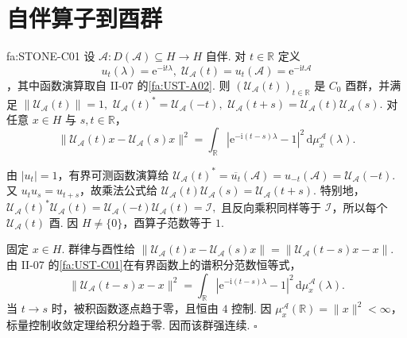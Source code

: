 \section{自伴算子到酉群}\label{sec:ii10-selfadjoint-to-group}

\begin{FAProposition}{fa:STONE-C01}
设 \(\displaystyle \mathcal A:D(\mathcal A)\subseteq H\to H\)
自伴. 对 \(\displaystyle t\in\mathbb R\) 定义
\[
u_t(\lambda)=\mathrm{e}^{-\mathrm{i}t\lambda},
\;
\mathcal U_{\mathcal A}(t)=u_t(\mathcal A)=\mathrm{e}^{-\mathrm{i}t\mathcal A}
\]
，其中函数演算取自 II-07 的\autoref{fa:UST-A02}. 则 \(\displaystyle(\mathcal U_{\mathcal A}(t))_{t\in\mathbb R}\) 是 \(\displaystyle C_0\) 酉群，并满足 \(\displaystyle \|\mathcal U_{\mathcal A}(t)\|=1,\) \(\displaystyle \mathcal U_{\mathcal A}(t)^*=\mathcal U_{\mathcal A}(-t),\) \(\displaystyle \mathcal U_{\mathcal A}(t+s) = \mathcal U_{\mathcal A}(t)\mathcal U_{\mathcal A}(s).\)
对任意 \(\displaystyle x\in H\) 与 \(\displaystyle s,t\in\mathbb R\)，
\[
\|\mathcal U_{\mathcal A}(t)x-\mathcal U_{\mathcal A}(s)x\|^2
=
\int_{\mathbb R}
|\mathrm{e}^{-\mathrm{i}(t-s)\lambda}-1|^2
\,\mathrm{d}\mu_x^{\mathcal A}(\lambda).
\]
\end{FAProposition}

\begin{FAProof}
由 \(\displaystyle|u_t|=1\)，有界可测函数演算给 \(\displaystyle \mathcal U_{\mathcal A}(t)^* = \overline{u_t}(\mathcal A) = u_{-t}(\mathcal A) = \mathcal U_{\mathcal A}(-t).\)
又 \(\displaystyle u_tu_s=u_{t+s}\)，故乘法公式给 \(\displaystyle \mathcal U_{\mathcal A}(t)\mathcal U_{\mathcal A}(s) = \mathcal U_{\mathcal A}(t+s).\)
特别地， \(\displaystyle \mathcal U_{\mathcal A}(t)^*\mathcal U_{\mathcal A}(t) = \mathcal U_{\mathcal A}(-t)\mathcal U_{\mathcal A}(t) = \mathcal I,\)
且反向乘积同样等于 \(\displaystyle\mathcal I\)，所以每个 \(\displaystyle\mathcal U_{\mathcal A}(t)\) 酉. 因 \(\displaystyle H\neq\{0\}\)，酉算子范数等于 \(\displaystyle1\).

固定 \(\displaystyle x\in H\). 群律与酉性给 \(\displaystyle \|\mathcal U_{\mathcal A}(t)x-\mathcal U_{\mathcal A}(s)x\| = \|\mathcal U_{\mathcal A}(t-s)x-x\|.\)
由 II-07 的\autoref{fa:UST-C01}在有界函数上的谱积分范数恒等式，
\[
\|\mathcal U_{\mathcal A}(t-s)x-x\|^2
=
\int_{\mathbb R}
|\mathrm{e}^{-\mathrm{i}(t-s)\lambda}-1|^2
\,\mathrm{d}\mu_x^{\mathcal A}(\lambda).
\]
当 \(\displaystyle t\to s\) 时，被积函数逐点趋于零，且恒由 \(\displaystyle4\) 控制. 因 \(\displaystyle\mu_x^{\mathcal A}(\mathbb R)=\|x\|^2<\infty\)，标量控制收敛定理给积分趋于零. 因而该群强连续.
\hfill\(\square\)
\end{FAProof}

